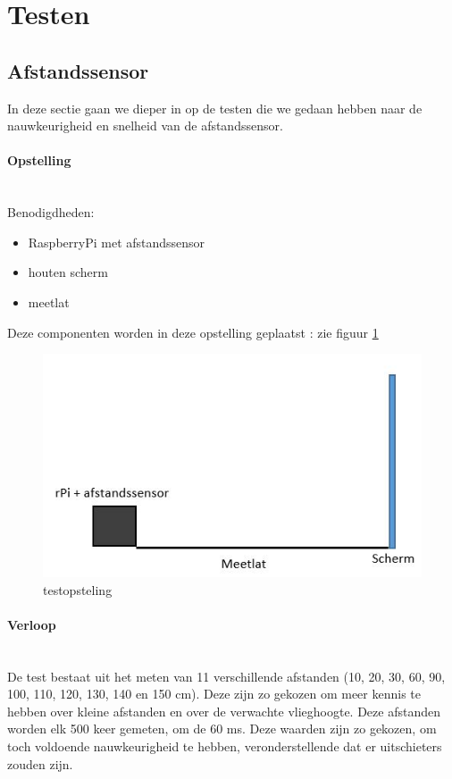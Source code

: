 \documentclass[tt]{penoverslag}
\begin{document}
\section{Testen}
\subsection{Afstandssensor}

In deze sectie gaan we dieper in op de testen die we gedaan hebben naar de nauwkeurigheid en snelheid van de afstandssensor.

\paragraph{Opstelling} ~\\ 
Benodigdheden:
\begin{itemize}
	\item RaspberryPi met afstandssensor
	\item houten scherm
	\item meetlat
\end{itemize}
Deze componenten worden in deze opstelling geplaatst : zie figuur \ref{opstelling}
\begin{figure}[ht!]%
\centering
\includegraphics[scale=0.6]{opstelling.jpg}%
\caption{testopsteling}%
\label{opstelling}%
\end{figure}

\paragraph{Verloop} ~\\ 
De test bestaat uit het meten van 11 verschillende afstanden (10, 20, 30, 60, 90, 100, 110, 120, 130, 140 en 150 cm). Deze zijn zo gekozen om meer kennis te hebben over kleine afstanden en over de verwachte vlieghoogte. Deze afstanden worden elk 500 keer gemeten, om de 60 ms. Deze waarden zijn zo gekozen, om toch voldoende nauwkeurigheid te hebben, veronderstellende dat er uitschieters zouden zijn.
\end{document}

